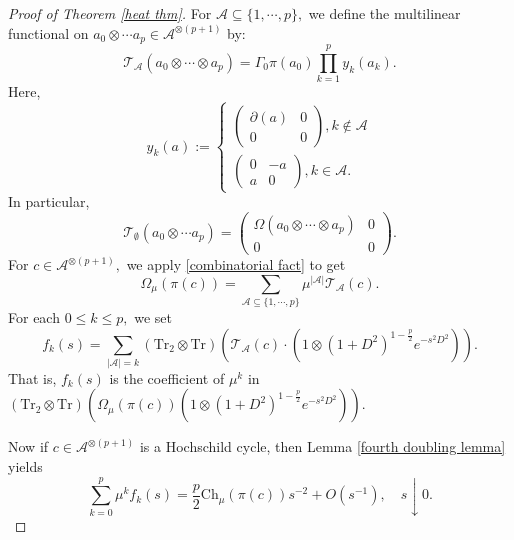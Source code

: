     \begin{proof}[Proof of Theorem \ref{heat thm}] 
        For $\mathscr{A}\subseteq\{1,\cdots,p\},$ we define the multilinear functional on $a_0\otimes\cdots a_p\in \mathcal{A}^{\otimes(p+1)}$ by:
        $$\mathcal{T}_{\mathscr{A}}(a_0\otimes\cdots\otimes a_p)=\Gamma_0\pi(a_0)\prod_{k=1}^p y_k(a_k).$$
        Here,
        \begin{equation*}
            y_k(a) := \begin{cases}
                        \begin{pmatrix} \partial(a) & 0 \\ 0 & 0\end{pmatrix}, k\notin\mathscr{A}\\
                        \begin{pmatrix} 0 & -a \\ a& 0\end{pmatrix}         , k\in\mathscr{A}.
                      \end{cases}
        \end{equation*}
        In particular,
        \begin{equation*}
            \mathcal{T}_{\emptyset}(a_0\otimes\cdots a_p) = \begin{pmatrix} 
                                                            \Omega(a_0\otimes\cdots\otimes a_p) & 0\\
                                                                0 & 0
                                                            \end{pmatrix}.
        \end{equation*}       
        For $c\in\mathcal{A}^{\otimes(p+1)},$ we apply \eqref{combinatorial fact} to get
        $$\Omega_{\mu}(\pi(c)) = \sum_{\mathscr{A}\subseteq\{1,\cdots,p\}}\mu^{|\mathscr{A}|}\mathcal{T}_{\mathscr{A}}(c).$$
        For each $0\leq k\leq p,$ we set
        $$f_k(s)=\sum_{|\mathscr{A}|=k}(\mathrm{Tr}_2\otimes\mathrm{Tr})(\mathcal{T}_{\mathscr{A}}(c)\cdot (1\otimes (1+D^2)^{1-\frac{p}{2}}e^{-s^2D^2})).$$
        That is, $f_k(s)$ is the coefficient of $\mu^k$ in $(\mathrm{Tr}_2\otimes \mathrm{\mathrm{Tr}})(\Omega_\mu(\pi(c))(1\otimes (1+D^2)^{1-\frac{p}{2}}e^{-s^2D^2}))$.
        
        Now if $c\in\mathcal{A}^{\otimes (p+1)}$ is a Hochschild cycle, then Lemma \ref{fourth doubling lemma} yields
        \begin{equation}\label{heat main epsilon}
            \sum_{k=0}^p\mu^kf_k(s) = \frac{p}{2}\mathrm{Ch}_{\mu}(\pi(c))s^{-2} + O(s^{-1}),\quad s\downarrow 0.
        \end{equation}
        

\end{proof}
